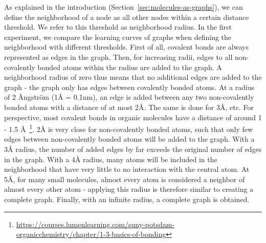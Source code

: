 As explained in the introduction (Section~\ref{sec:molecules-as-graphs}), we can define the neighborhood of a node as all other nodes within a certain distance threshold. We refer to this threshold as neighborhood radius. In the first experiment, we compare the learning curves of graphs when defining the neighborhood with different thresholds. First of all, covalent bonds are always represented as edges in the graph. Then, for increasing radii, edges to all non-covalently bonded atoms within the radius are added to the graph. A neighborhood radius of zero thus means that no additional edges are added to the graph - the graph only has edges between covalently bonded atoms. At a radius of 2 Ångström (1Å = 0.1nm), an edge is added between any two non-covalently bonded atoms with a distance of at most 2Å. The same is done for 3Å, etc. For perspective, most covalent bonds in organic molecules have a distance of around 1 - 1.5 Å~\footnote{\url{https://courses.lumenlearning.com/suny-potsdam-organicchemistry/chapter/1-3-basics-of-bonding}}. 2Å is very close for non-covalently bonded atoms, such that only few edges between non-covalently bonded atoms will be added to the graph. With a 3Å radius, the number of added edges by far exceeds the original number of edges in the graph. With a 4Å radius, many atoms will be included in the neighborhood that have very little to no interaction with the central atom. At 5Å, for many small molecules, almost every atom is considered a neighbor of almost every other atom - applying this radius is therefore similar to creating a complete graph. Finally, with an infinite radius, a complete graph is obtained.

